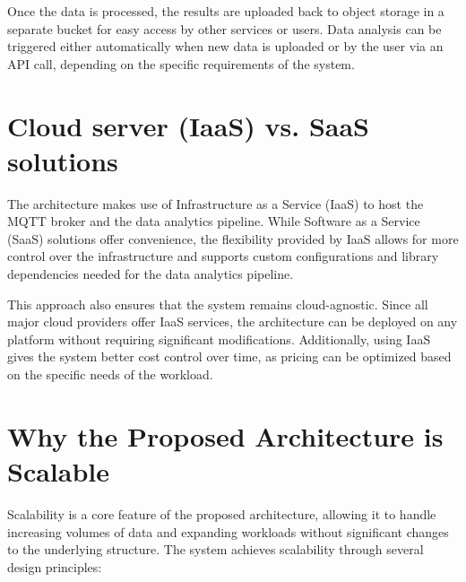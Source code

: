 Once the data is processed, the results are uploaded back to object storage in a separate bucket for easy access by other services or users. Data analysis can be triggered either automatically when new data is uploaded or by the user via an API call, depending on the specific requirements of the system.

\section{Cloud server (IaaS) vs. SaaS solutions}

The architecture makes use of Infrastructure as a Service (IaaS) to host the MQTT broker and the data analytics pipeline. While Software as a Service (SaaS) solutions offer convenience, the flexibility provided by IaaS allows for more control over the infrastructure and supports custom configurations and library dependencies needed for the data analytics pipeline.

This approach also ensures that the system remains cloud-agnostic. Since all major cloud providers offer IaaS services, the architecture can be deployed on any platform without requiring significant modifications. Additionally, using IaaS gives the system better cost control over time, as pricing can be optimized based on the specific needs of the workload.

\section{Why the Proposed Architecture is Scalable}

Scalability is a core feature of the proposed architecture, allowing it to handle increasing volumes of data and expanding workloads without significant changes to the underlying structure. The system achieves scalability through several design principles:


